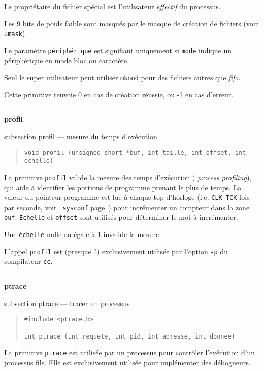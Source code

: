 \documentclass [twoside] {report}
\newcommand {\primitive} [1]
    {
	\phantomsection
	{\large \bf #1}
	\addcontentsline {toc} {subsection} {#1}
    }
\newcommand {\separation}
    {
	\vspace {5mm}
	\nopagebreak
	\hrule
    }
\begin{document}
Le propriétaire du fichier spécial est
l'utilisateur {\it effectif} du processus.

Les 9 bits de poids faible sont masqués par le
masque de création de fichiers (voir {\tt umask}).

Le paramètre {\tt périphérique} est signifiant
uniquement si {\tt mode} indique un périphérique en
mode bloc ou caractère.

Seul le super utilisateur peut utiliser {\tt mknod}
pour des fichiers autres que {\it fifo}.

Cette primitive renvoie 0 en cas de création
réussie, ou -1 en cas d'erreur.




\separation
\primitive {profil} --- mesure du temps d'exécution

\begin {quote}
\begin {verbatim}
void profil (unsigned short *buf, int taille, int offset, int echelle)
\end{verbatim}
\end {quote}

La primitive {\tt profil} valide la mesure des temps d'exécution ({\it
process profiling}), qui aide à identifier les portions de programme
prenant le plus de temps. La valeur du pointeur programme est lue à
chaque top d'horloge (i.e. {\tt CLK\_TCK} fois par seconde, voir {\tt
sysconf} page~\pageref {sysconf}) pour incrémenter un compteur dans
la zone {\tt buf}. {\tt Echelle} et {\tt offset} sont utilisés pour
déterminer le mot à incrémenter.

Une {\tt échelle} nulle ou égale à 1 invalide la
mesure.

L'appel {\tt profil} est (presque ?) exclusivement
utilisée par l'option {\tt -p} du compilateur {\tt cc}.




\separation
\primitive {ptrace} --- tracer un processus

\begin {quote}
\begin {verbatim}
#include <ptrace.h>

int ptrace (int requete, int pid, int adresse, int donnee)
\end{verbatim}
\end {quote}

La primitive {\tt ptrace} est utilisée par un
processus pour contrôler l'exécution d'un
processus fils. Elle est exclusivement utilisée
pour implémenter des débogueurs.
\end{document}
